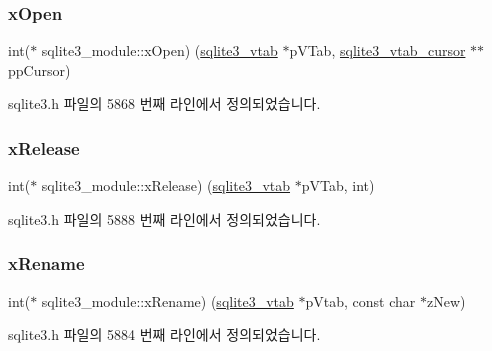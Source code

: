 \mbox{\label{structsqlite3__module_a3f1e18ef5e5bd4ddbd9500c7cd951f34}} 
\subsubsection{\texorpdfstring{x\+Open}{xOpen}}
{\footnotesize\ttfamily int($\ast$ sqlite3\+\_\+module\+::x\+Open) (\hyperlink{structsqlite3__vtab}{sqlite3\+\_\+vtab} $\ast$p\+V\+Tab, \hyperlink{structsqlite3__vtab__cursor}{sqlite3\+\_\+vtab\+\_\+cursor} $\ast$$\ast$pp\+Cursor)}



sqlite3.\+h 파일의 5868 번째 라인에서 정의되었습니다.

\mbox{\label{structsqlite3__module_ac5f0d86a3e9a26668dbf1251a7c51517}} 
\subsubsection{\texorpdfstring{x\+Release}{xRelease}}
{\footnotesize\ttfamily int($\ast$ sqlite3\+\_\+module\+::x\+Release) (\hyperlink{structsqlite3__vtab}{sqlite3\+\_\+vtab} $\ast$p\+V\+Tab, int)}



sqlite3.\+h 파일의 5888 번째 라인에서 정의되었습니다.

\mbox{\label{structsqlite3__module_a684849a921202d5dec6012824c1d2308}} 
\subsubsection{\texorpdfstring{x\+Rename}{xRename}}
{\footnotesize\ttfamily int($\ast$ sqlite3\+\_\+module\+::x\+Rename) (\hyperlink{structsqlite3__vtab}{sqlite3\+\_\+vtab} $\ast$p\+Vtab, const char $\ast$z\+New)}



sqlite3.\+h 파일의 5884 번째 라인에서 정의되었습니다.

\mbox{\label{structsqlite3__module_a2168ba5102151712f8bbfdc5b2ccaf9c}} 
